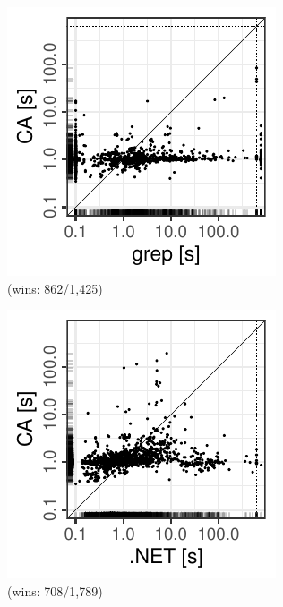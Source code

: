 \documentclass[acmsmall,screen]{acmart}
\begin{document}
{\begin{figure}[t]
\newlength{\triplepiclen}
\setlength{\triplepiclen}{4.5cm}
\begin{subfigure}[b]{\linewidth}
\begin{center}
  \begin{minipage}{\triplepiclen}
  \begin{center}
    \includegraphics[width=1\triplepiclen,keepaspectratio]{figures/grep-vs-cad.pdf}\\
    \hspace*{5mm}
    (\catool wins: 862/1,425)
  \end{center}
  \end{minipage}
  \begin{minipage}{\triplepiclen}
  \begin{center}
  \includegraphics[width=1\triplepiclen,keepaspectratio]{figures/dotnet-vs-cad.pdf}\\
    \hspace*{5mm}
    (\catool wins: 708/1,789)
  \end{center}
  \end{minipage}

\end{center}
\end{subfigure}
\end{figure}}
\end{document}
